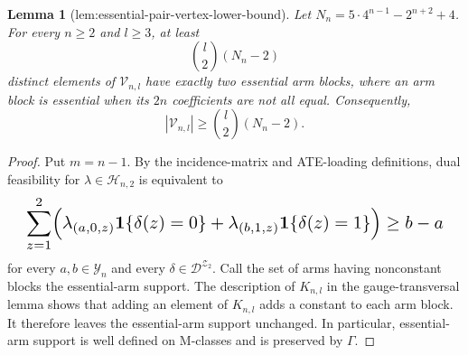\documentclass{article}
\newtheorem{lemma}{Lemma}
\begin{document}
\begin{lemma}[lem:essential-pair-vertex-lower-bound]\label{lem:essential-pair-vertex-lower-bound}
Let \(N_n=5\cdot4^{n-1}-2^{n+2}+4\). For every \(n\ge2\) and \(l\ge3\), at least \[\binom{l}{2}(N_n-2)\] distinct elements of \(\mathcal V_{n,l}\) have exactly two essential arm blocks, where an arm block is essential when its \(2n\) coefficients are not all equal. Consequently, \[|\mathcal V_{n,l}|\ge\binom{l}{2}(N_n-2).\]
\end{lemma}
\begin{proof}
Put \(m=n-1\). By the incidence-matrix and ATE-loading definitions, dual feasibility for \(\lambda\in\mathcal H_{n,2}\) is equivalent to
\[
\makebox[\linewidth][c]{\resizebox{0.98\linewidth}{!}{\par\noindent \makebox[\linewidth][c]{\resizebox{0.98\linewidth}{!}{\(\displaystyle \displaystyle \sum_{z=1}^{2}\Bigl(\lambda_{(a,0,z)}\mathbf 1\{\delta(z)=0\}+\lambda_{(b,1,z)}\mathbf 1\{\delta(z)=1\}\Bigr)\ge b-a\)}}\par\noindent}}
\]
for every \(a,b\in\mathcal Y_n\) and every \(\delta\in\mathcal D^{\mathcal Z_2}\). Call the set of arms having nonconstant blocks the essential-arm support. The description of \(K_{n,l}\) in the gauge-transversal lemma shows that adding an element of \(K_{n,l}\) adds a constant to each arm block. It therefore leaves the essential-arm support unchanged. In particular, essential-arm support is well defined on M-classes and is preserved by \(\Gamma\).


\end{proof}
\end{document}
